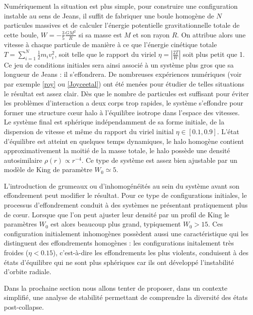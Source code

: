 Numériquement la situation est plus simple, pour construire une configuration instable au sens de Jeans, il suffit de fabriquer une boule homogène de $N$ particules massives et de calculer l'énergie potentielle gravitationnelle totale de cette boule, $W=-\frac{3}{5}\frac{GM^2}{R}$ si sa masse est $M$ et son rayon $R$. On attribue alors une vitesse à chaque particule de manière à ce que l'énergie cinétique totale $T=\sum_{i=1}^N\frac{1}{2}m_i v_i^2$, soit telle que le rapport du viriel $\eta=\left|\frac{2T}{W}\right|$ soit plus petit que 1.  Ce jeu de conditions initiales sera ainsi associé à un système plus gros que sa longueur de Jeans : il s'effondrera. De nombreuses expériences numériques (voir par exemple \ref{roy} ou \ref{Joyceetal}) ont été menées pour étudier de telles situations le résultat est assez clair. Dès que le nombre de particules est suffisant pour éviter les problèmes d'interaction a deux corps trop rapides, le système s'effondre pour former une structure c\oe ur halo à l'équilibre isotrope dans l'espace des vitesses. Le système final est sphérique indépendamment de sa forme initiale, de la dispersion de vitesse et même du rapport du viriel initial $\eta\in[0.1, 0.9]$. L'état d'équilibre est atteint en quelques temps dynamiques, le halo homogène contient approximativement la moitié de la masse totale, le halo possède une densité autosimilaire $\rho(r)\propto r^{-4}$. Ce type de système est assez bien ajustable par un modèle de King de paramètre $W_0\simeq 5$.

L'introduction de grumeaux ou d'inhomogénéités au sein du système avant son effondrement peut modifier le résultat. Pour ce type de configurations initiales, le processus d'effondrement conduit à des systèmes ne présentant pratiquement plus de c\oe ur. Lorsque que l'on peut ajuster leur densité  par un profil de King le paramètres $W_0$ est alors beaucoup plus grand, typiquement  $W_0>15$. Ces configuration initialement inhomogènes  possèdent aussi une caractéristique qui les distinguent des effondrements homogènes : les configurations initalement très froides ($\eta<0.15$), c'est-à-dire les effondrements les plus violents, conduisent à des états d'équilibre qui ne sont plus sphériques car ils ont développé l'instabilité d'orbite radiale.  


Dans la prochaine section nous allons tenter de proposer, dans un contexte simplifié, une analyse de stabilité permettant de comprendre la diversité des états post-collapse.

